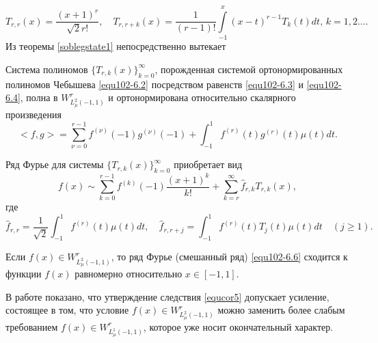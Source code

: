   \begin{equation}\label{equ102-6.4}
 T_{r,r}(x) =\frac{(x+1)^r}{\sqrt{2}r!},\quad T_{r,r+k}(x) =\frac{1}{(r-1)!}\int\limits_{-1}^x(x-t)^{r-1}T_k(t)dt, \, k=1,2\ldots.
\end{equation}
Из теоремы \ref{soblegstate1} непосредственно вытекает
\begin{corollary}\label{equcor5}
  Система полиномов $\{T_{r,k}(x)\}_{k=0}^\infty$, порожденная системой ортонормированных полиномов Чебышева \eqref{equ102-6.2} посредством равенств \eqref{equ102-6.3} и \eqref{equ102-6.4}, полна  в $W^r_{L^2_\mu(-1,1)}$ и ортонормирована относительно скалярного произведения
\begin{equation}\label{equ102-6.5}
<f,g>=\sum_{\nu=0}^{r-1}f^{(\nu)}(-1)g^{(\nu)}(-1)+\int_{-1}^{1} f^{(r)}(t)g^{(r)}(t)\mu(t) dt.
\end{equation}
\end{corollary}

Ряд Фурье для системы   $\{T_{r,k}(x)\}_{k=0}^\infty$ приобретает вид
\begin{equation}\label{equ102-6.6}
f(x)\sim \sum_{k=0}^{r-1} f^{(k)}(-1)\frac{(x+1)^k}{k!}+ \sum_{k=r}^\infty \hat f_{r,k}T_{r,k}(x),
\end{equation}
где
  \begin{equation}\label{equ102-6.7}
\hat f_{r,r}=\frac{1}{\sqrt{2}}\int_{-1}^1 f^{(r)}(t)\mu(t)dt,\quad \hat f_{r,r+j}=\int_{-1}^1 f^{(r)}(t)T_{j}(t)\mu(t)dt\quad(j\ge1).
\end{equation}

\begin{corollary}\label{equcor6}
 Если $f(x)\in W^r_{L^2_\mu(-1,1)}$, то ряд Фурье (смешанный ряд) \eqref{equ102-6.6} сходится к функции $f(x)$ равномерно относительно $x\in[-1,1]$.
\end{corollary}

\begin{remark}
В работе \cite{equ102-Shar20} показано, что утверждение следствия \ref{equcor5} допускает  усиление, состоящее в том, что  условие $f(x)\in W^r_{L^2_\mu(-1,1)}$ можно заменить более слабым требованием $f(x)\in W^r_{L^1_\mu(-1,1)}$, которое уже носит окончательный характер.
\end{remark}


